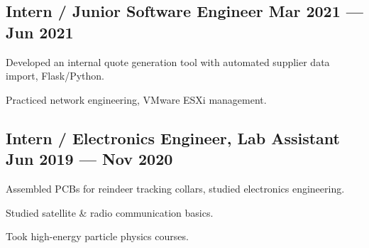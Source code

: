 \documentclass[letter,10pt]{article}
\begin{document}
\subsection{{Intern / Junior Software Engineer \hfill Mar 2021 --- Jun 2021}}
\begin{zitemize}
\item Developed an internal quote generation tool with automated supplier data import, Flask/Python.
\item Practiced network engineering, VMware ESXi management.
\end{zitemize}

\subsection{{Intern / Electronics Engineer, Lab Assistant \hfill Jun 2019 --- Nov 2020}}
\begin{zitemize}
\item Assembled PCBs for reindeer tracking collars, studied electronics engineering.
\item Studied satellite \& radio communication basics.
\item Took high-energy particle physics courses.
\end{zitemize}
\end{document}
